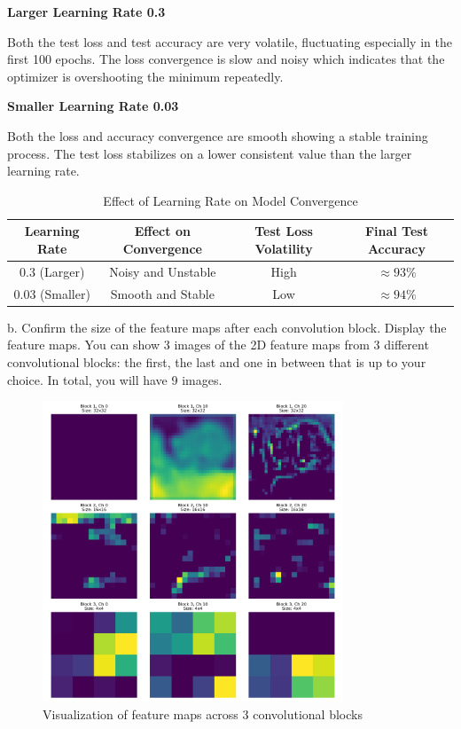 \textbf{Larger Learning Rate 0.3}

Both the test loss and test accuracy are very volatile, fluctuating especially in the first 100 epochs. The loss convergence is slow and noisy which indicates that the optimizer is overshooting the minimum repeatedly.

\textbf{Smaller Learning Rate 0.03}

Both the loss and accuracy convergence are smooth showing a stable training process. The test loss stabilizes on a lower consistent value than the larger learning rate.

\begin{table}[h]
    \centering
    \caption{Effect of Learning Rate on Model Convergence}
    \begin{tabular}{|c|c|c|c|}
        \hline
        \textbf{Learning Rate} & \textbf{Effect on Convergence} & \textbf{Test Loss Volatility} & \textbf{Final Test Accuracy} \\
        \hline
        $0.3$ (Larger) & Noisy and Unstable & High & $\approx 93\%$ \\
        \hline
        $0.03$ (Smaller) &  Smooth and Stable & Low & $\approx 94\%$ \\
        \hline
    \end{tabular}
\end{table}

b. Confirm the size of the feature maps after each convolution block. Display the feature maps. You can show 3 images of the 2D feature maps from 3 different convolutional blocks: the first, the last and one in between that is up to your choice. In total, you will have 9 images.

\begin{figure}[H] 
    \centering
    \includegraphics[width=0.8\textwidth]{assignment_1/report/images/ex_2_feature_maps_visualization.png} 
    \caption{Visualization of  feature maps across 3 convolutional blocks}
    \label{figure_1}
\end{figure}